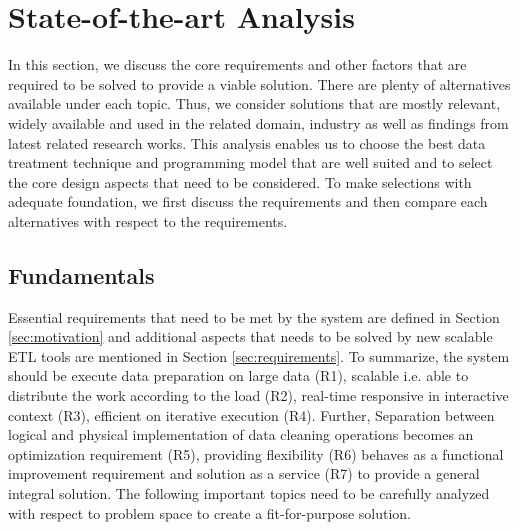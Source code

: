 
\chapter{State-of-the-art Analysis} %
\label{Chapter3} %


In this section, we discuss the core requirements and other factors that are required to be solved to provide a viable solution. There are plenty of alternatives available under each topic. Thus, we consider solutions that are mostly relevant, widely available and used in the related domain, industry as well as findings from latest related research works. This analysis enables us to choose the best data treatment technique and programming model that are well suited and to select the core design aspects that need to be considered. To make selections with adequate foundation, we first discuss the requirements and then compare each alternatives with respect to the requirements. 
\section{Fundamentals }
\label{sec:fundamentals}
Essential requirements that need to be met by the system are defined in Section \ref{sec:motivation} and additional aspects that needs to be solved by new scalable ETL tools are mentioned in Section \ref{sec:requirements}. To summarize, the system should be execute data preparation on large data (R1), scalable i.e. able to distribute the work according to the load  (R2), real-time responsive in interactive context (R3), efficient on iterative execution (R4). Further, Separation between logical and physical implementation of data cleaning operations becomes an optimization requirement (R5), providing flexibility (R6) behaves as a functional improvement requirement and solution as a service (R7) to provide a general integral solution.  The following important topics need to be carefully analyzed with respect to problem space to create a fit-for-purpose solution. 

